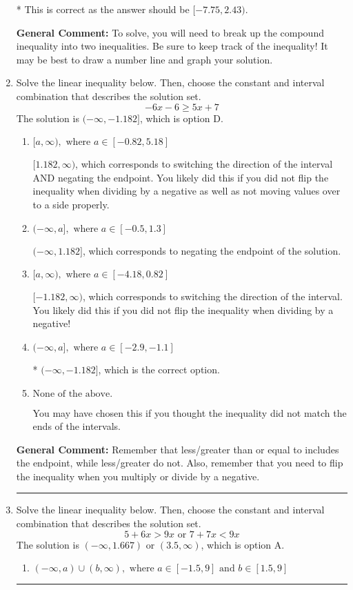 \documentclass{extbook}[14pt]
\newcommand{\litem}[1]{\item #1

\rule{\textwidth}{0.4pt}}
\begin{document}
\begin{enumerate}
{\begin{enumerate}[label=\Alph*.]
* This is correct as the answer should be $[-7.75, 2.43)$.
\end{enumerate}

\textbf{General Comment:} To solve, you will need to break up the compound inequality into two inequalities. Be sure to keep track of the inequality! It may be best to draw a number line and graph your solution.
}
\litem{
Solve the linear inequality below. Then, choose the constant and interval combination that describes the solution set.
\[ -6x -6 \geq 5x + 7 \]The solution is \( (-\infty, -1.182] \), which is option D.\begin{enumerate}[label=\Alph*.]
\item \( [a, \infty), \text{ where } a \in [-0.82, 5.18] \)

 $[1.182, \infty)$, which corresponds to switching the direction of the interval AND negating the endpoint. You likely did this if you did not flip the inequality when dividing by a negative as well as not moving values over to a side properly.
\item \( (-\infty, a], \text{ where } a \in [-0.5, 1.3] \)

 $(-\infty, 1.182]$, which corresponds to negating the endpoint of the solution.
\item \( [a, \infty), \text{ where } a \in [-4.18, 0.82] \)

 $[-1.182, \infty)$, which corresponds to switching the direction of the interval. You likely did this if you did not flip the inequality when dividing by a negative!
\item \( (-\infty, a], \text{ where } a \in [-2.9, -1.1] \)

* $(-\infty, -1.182]$, which is the correct option.
\item \( \text{None of the above}. \)

You may have chosen this if you thought the inequality did not match the ends of the intervals.
\end{enumerate}

\textbf{General Comment:} Remember that less/greater than or equal to includes the endpoint, while less/greater do not. Also, remember that you need to flip the inequality when you multiply or divide by a negative.
}
\litem{
Solve the linear inequality below. Then, choose the constant and interval combination that describes the solution set.
\[ 5 + 6 x > 9 x \text{ or } 7 + 7 x < 9 x \]The solution is \( (-\infty, 1.667) \text{ or } (3.5, \infty) \), which is option A.\begin{enumerate}[label=\Alph*.]
\item \( (-\infty, a) \cup (b, \infty), \text{ where } a \in [-1.5, 9] \text{ and } b \in [1.5, 9] \)


\end{enumerate}}
\end{enumerate}
\end{document}
